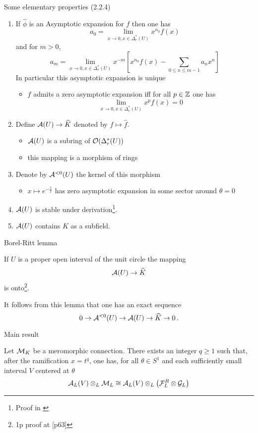 \begin{frame}{Some elementary properties (2.2.4)}
  \begin{enumerate}
    \item If $\hat\phi$ is an Asymptotic expansion for $f$ then one has
      \[
        a_0=\lim_{x\to 0,x\in\Delta_r^*(U)}x^{n_0}f(x)
      \]
      and for $m>0$,
      \[
        a_m=\lim_{x\to 0,x\in\Delta_r^*(U)}x^{-m}
          \left[x^{n_0}f(x)-\sum_{0\leq n\leq m-1}a_nx^n\right]
      \]
      In particular this asymptotic expansion is unique
      \begin{itemize}
        \item $f$ admits a zero asymptotic expansion iff for all $p\in\mathbb{Z}$
          one has
          \[
            \lim_{x\to 0,x\in\Delta_r^*(U)}x^pf(x)=0
          \]
      \end{itemize}
    \item
      Define $\mathcal{A}(U)\to \widehat K$ denoted by $f\mapsto \hat{f}$.
      \begin{itemize}
        \item $\mathcal{A}(U)$ is a subring of $\mathcal{O}(\Delta_r^*(U))$
        \item this mapping is a morphism of rings
      \end{itemize}
    \item Denote by $\mathcal{A}^{<0}(U)$ the kernel of this morphism
      \begin{itemize}
        \item $x\mapsto e^{-\frac{1}{x}}$ has zero asymptotic expansion in
          some sector around $\theta=0$
      \end{itemize}
    \item $\mathcal{A}(U)$ is stable under derivation\footnote{Proof in
      \cite{sabbah_cimpa90}}.
    \item $\mathcal{A}(U)$ contains $K$ as a subfield.
  \end{enumerate}
\end{frame}

\begin{frame}{Borel-Ritt lemma}
  \begin{lem}[2.2.5]
  If $U$ is a proper open interval of the unit circle the mapping
  \[
  \mathcal{A}(U)\to\widehat{K}
  \]
  is onto\footnote{1p proof at \cite{sabbah_cimpa90}[p63]}.
  \end{lem}

  It follows from this lemma that one has an exact sequence
  \[
    0 \to \mathcal{A}^{<0}(U) \to \mathcal{A}(U) \to \widehat{K} \to 0 \,.
  \]
\end{frame}

\begin{frame}{Main result}
  \begin{thm}[2.3.1]
    Let $\mathcal{M}_K$ be a meromorphic connection. There exists an integer $q\geq 1$
    such that, after the ramification $x=t^q$, one has, for all $\theta\in S^1$
    and each sufficiently small interval $V$ centered at $\theta$
    \[
      \mathcal{A}_L(V)\otimes_L\mathcal{M}_L \cong
        \mathcal{A}_L(V)\otimes_L\left(\mathcal{F}_L^R\otimes\mathcal{G}_L\right)
    \]
  \end{thm}
\end{frame}
